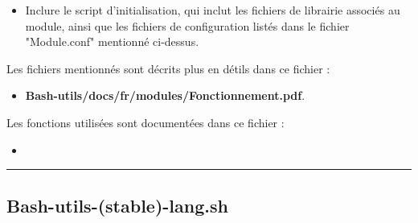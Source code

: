 \documentclass[a4paper,10pt]{article}
\begin{document}
\begin{justify}
    \begin{itemize}
        \item Inclure le script d'initialisation, qui inclut les fichiers de librairie associés au module, ainsi que les fichiers de configuration listés dans le fichier "Module.conf" mentionné ci-dessus.
    \end{itemize}
\end{justify}

\begin{justify}
    Les fichiers mentionnés sont décrits plus en détils dans ce fichier :

    \begin{itemize}
        \item \textbf{\color{path}Bash-utils/docs/fr/modules/Fonctionnement.pdf}.
    \end{itemize}
\end{justify}

\begin{justify}
    Les fonctions utilisées sont documentées dans ce fichier :

    \begin{itemize}
        \item \textbf{\color{path}}
    \end{itemize}

\end{justify}




\color{sec2}\par\noindent\rule{\textwidth}{0.4pt}\color{text}

\color{sec2}
\subsection{\color{path}Bash-utils-(stable)-lang.sh}\color{text}
\end{document}
